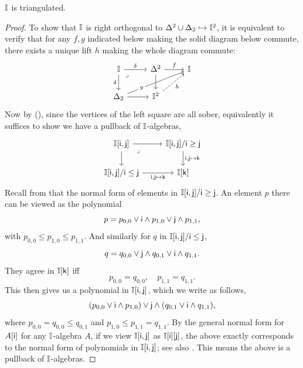 \begin{proposition}[\AxiomSQCF]\label{specistriangulated}
  $\mathbb{I}$ is triangulated.
\end{proposition}
\begin{proof}
  To show that $\mathbb{I}$ is right orthogonal to $\Delta^2 \cup \Delta_2 \hookrightarrow \mathbb{I}^2$, it is equivalent to verify that for any $f,g$ indicated below making the solid diagram below commute, there exists a unique lift $h$ making the whole diagram commute:
  \[\begin{tikzcd}
    \mbb{I} \ar[r, "\delta"] \ar[d, "\delta"'] & \Delta^2 \ar[r, "f"] \ar[d] & \mbb{I} \\
    \Delta_2 \ar[urr, "g"{description, near start}] \ar[r] & \mbb{I}^2 \ar[ur, dashed, "h"']
    \arrow["\lrcorner"{anchor=center, pos=0.125}, draw=none, from=1-1, to=2-2]
  \end{tikzcd}\]
  Now by (\AxiomSQCF), since the vertices of the left square are all sober, equivalently it suffices to show we have a pullback of $\mathbb{I}$-algebras,
  \[\begin{tikzcd}
    {\mbb{I}[\ms{i},\ms{j}]} \ar[r] \ar[d] & {\mbb{I}[\ms{i},\ms{j}]/\ms{i} \ge \ms{j}} \ar[d, "{\ms{i},\ms{j} \mapsto\ms{k}}"] \\
    {\mbb{I}[\ms{i},\ms{j}]/\ms{i} \le \ms{j}} \ar[r, "{\ms{i},\ms{j}\mapsto\ms{k}}"'] & {\mbb{I}[\ms{k}]}
    \arrow["\lrcorner"{anchor=center, pos=0.125}, draw=none, from=1-1, to=2-2]
  \end{tikzcd}\]
  Recall from  that the normal form of elements in $\mathbb{I}[\mathsf{i},\mathsf{j}]/\mathsf{i}\ge \mathsf{j}$. An element $p$ there can be viewed as the polynomial 
  \[ p = p_{0,0} \vee \mathsf{i}\wedge p_{1,0} \vee \mathsf{j}\wedge p_{1,1}\text{,} \]
  with $p_{0,0} \le p_{1,0} \le p_{1,1}$. And similarly for $q$ in $\mathbb{I}[\mathsf{i},\mathsf{j}]/\mathsf{i} \le \mathsf{j}$, 
  \[ q = q_{0,0} \vee \mathsf{j} \wedge q_{0,1} \vee \mathsf{i} \wedge q_{1,1}\text{.} \]
  They agree in $\mathbb{I}[\mathsf{k}]$ iff 
  \[ p_{0,0} = q_{0,0}, \quad p_{1,1} = q_{1,1}\text{.} \]
  This then gives us a polynomial in $\mathbb{I}[\mathsf{i},\mathsf{j}]$, which we write as follows,
  \[ (p_{0,0} \vee \mathsf{i} \wedge p_{1,0}) \vee \mathsf{j} \wedge (q_{0,1} \vee \mathsf{i} \wedge q_{1,1})\text{,} \]
  where $p_{0,0} = q_{0,0} \le q_{0,1}$ and $p_{1,0} \le p_{1,1} = q_{1,1}$. 
  By the general normal form for $A[\mathsf{i}]$ for any $\mathbb{I}$-algebra $A$, if we view $\mathbb{I}[\mathsf{i},\mathsf{j}]$ as $\mathbb{I}[\mathsf{i}][\mathsf{j}]$, the above exactly corresponds to the normal form of polynomials in $\mathbb{I}[\mathsf{i},\mathsf{j}]$; see also \citet[Ch.\ 1, Thm.\ 10.21]{lausch2000algebra}. This means the above is a pullback of $\mathbb{I}$-algebras.
\end{proof}



